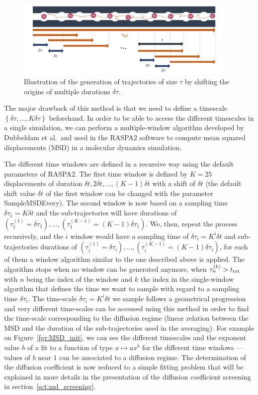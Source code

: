\documentclass[main]{subfiles}
\begin{document}
\begin{figure}[ht]
  \centering
    \includegraphics[width=0.95\textwidth]{figures/5-diffusion/diffusion_averaging.pdf}
    \caption{Illustration of the generation of trajectories of size $\tau$ by shifting the origins of multiple durations $\delta\tau$. }\label{fgr:window_msd}
\end{figure}

The major drawback of this method is that we need to define a timescale $\left\{\delta\tau, \ldots, K\delta\tau\right\}$ beforehand. In order to be able to access the different timescales in a single simulation, we can perform a multiple-window algorithm developed by Dubbeldam et al.\ and used in the RASPA2 software to compute mean squared displacements (MSD) in a molecular dynamics simulation.

The different time windows are defined in a recursive way using the default parameters of RASPA2. The first time window is defined by $K=25$ displacements of duration $\delta t, 2\delta t, \ldots,(K-1)\delta t$ with a shift of $\delta t$ (the default shift value $\delta t$ of the first window can be changed with the parameter SampleMSDEvery). The second window is now based on a sampling time $\delta \tau_1 = K\delta t$ and the sub-trajectories will have durations of $\left(\tau_1^{(1)} = \delta\tau_1\right),\ldots,\left(\tau_1^{(K-1)} = (K-1)\delta\tau_1\right)$. We, then, repeat the process recursively, and the $i$ window would have a sampling time of $\delta \tau_i = K^i\delta t$ and sub-trajectories durations of $\left(\tau_i^{(1)} = \delta\tau_i\right),\ldots,\left(\tau_i^{(K-1)} = (K-1)\delta\tau_i\right)$, for each of them a window algorithm similar to the one described above is applied. The algorithm stops when no window can be generated anymore, when $\tau_n^{(k)}>t_{\text{tot}}$ with $n$ being the index of the window and $k$ the index in the single-window algorithm that defines the time we want to sample with regard to a sampling time $\delta\tau_i$. The time-scale $\delta \tau_i = K^i\delta t$ we sample follows a geometrical progression and very different time-scales can be accessed using this method in order to find the time-scale corresponding to the diffusion regime (linear relation between the MSD and the duration of the sub-trajectories used in the averaging). For example on Figure~\ref{fgr:MSD_init}, we can see the different timescales and the exponent value $b$ of a fit to a function of type $x \mapsto ax^b$ for the different time windows --- values of $b$ near $1$ can be associated to a diffusion regime. The determination of the diffusion coefficient is now reduced to a simple fitting problem that will be explained in more details in the presentation of the diffusion coefficient screening in section~\ref{sct:md_screening}.
\end{document}
